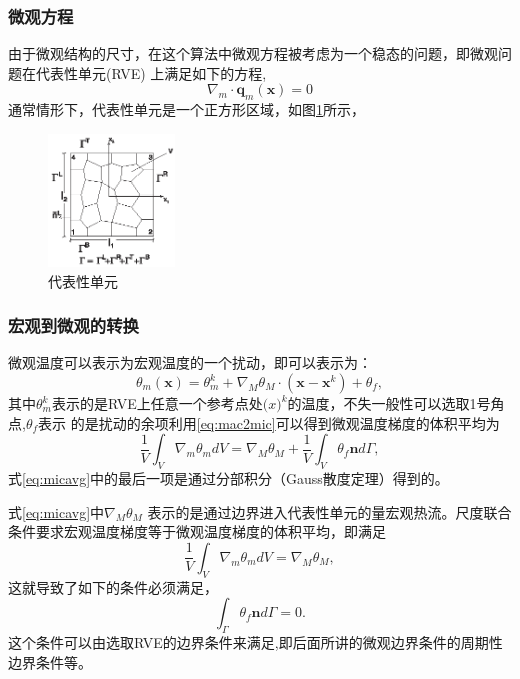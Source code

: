 \subsubsection{微观方程}
由于微观结构的尺寸，在这个算法中微观方程被考虑为一个稳态的问题，即微观问题在代表性单元(RVE)
上满足如下的方程,
\begin{equation}
	\nabla_m \cdot \mathbf{q}_m(\mathbf{x}) = 0
\end{equation}
通常情形下，代表性单元是一个正方形区域，如图\ref{fig:rve}所示，
\begin{figure}[htbp]
	\begin{center}
		\includegraphics[width=0.3\textwidth]{pics/RVE.eps}
	\end{center}
	\caption{代表性单元}
	\label{fig:rve}
\end{figure}

\subsubsection{宏观到微观的转换}
微观温度可以表示为宏观温度的一个扰动，即可以表示为：
\begin{equation}
	\theta_m(\mathbf{x}) = \theta_m^k + \nabla_M \theta_M \cdot (\mathbf{x}-\mathbf{x}^k) + \theta_f,
	\label{eq:mac2mic}
\end{equation}
其中$\theta_m^k$表示的是RVE上任意一个参考点处$\mathbf(x)^k$的温度，不失一般性可以选取1号角点,$\theta_f$表示
的是扰动的余项利用\eqref{eq:mac2mic}可以得到微观温度梯度的体积平均为
\begin{equation}
	\frac{1}{V}\int_V \nabla_m \theta_m dV =\nabla_M\theta_M +\frac{1}{V}\int_V \theta_f \mathbf{n}d\Gamma,
	\label{eq:micavg}
\end{equation}
式\eqref{eq:micavg}中的最后一项是通过分部积分（Gauss散度定理）得到的。

式\eqref{eq:micavg}中$\nabla_M \theta_M$ 表示的是通过边界进入代表性单元的量宏观热流。尺度联合条件要求宏观温度梯度等于微观温度梯度的体积平均，即满足
\begin{equation}
	\frac{1}{V}\int_V \nabla_m \theta_m dV =\nabla_M\theta_M,	
	\label{eq:relation1}
\end{equation}
这就导致了如下的条件必须满足，
\begin{equation}
	\int_{\Gamma} \theta_f \mathbf{n}d\Gamma = 0.
	\label{eq:condrve}
\end{equation}
这个条件可以由选取RVE的边界条件来满足,即后面所讲的微观边界条件的周期性边界条件等。

